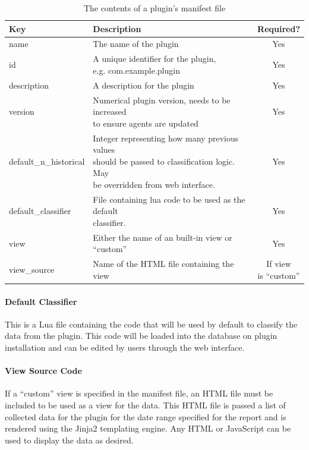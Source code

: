\documentclass[bsc,deptreport,twoside,parskip,singlespacing,notimes]{infthesis}
\begin{document}
\begin{table}[H]
	\centering
	\caption{The contents of a plugin's manifest file}
	\label{table-manifest-contents}
    \begin{tabular}{|l|l|c|}
    \hline
    \textbf{Key} & \textbf{Description} & \textbf{Required?} \\ \hline \hline
    name
    	& The name of the plugin
    	& Yes \\ \hline
    id
    	& \shortstack[l]{A unique identifier for the plugin,\\
    		e.g. com.example.plugin}
    	& Yes \\ \hline
    description
    	& A description for the plugin
    	& Yes \\ \hline
    version
    	& \shortstack[l]{Numerical plugin version, needs to be increased\\to ensure
    		agents are updated}
    	& Yes \\ \hline
    default\_n\_historical
    	& \shortstack[l]{Integer representing how many previous values \\
    		should be passed to classification logic. May\\be overridden from web interface.}
    	& Yes \\ \hline
    default\_classifier
    	& \shortstack[l]{File containing lua code to be used as the default\\
    		classifier.}
    	& Yes \\ \hline
    view
    	& Either the name of an built-in view or ``custom''
    	& Yes \\ \hline
    view\_source
    	& Name of the HTML file containing the view
    	& \shortstack[c]{If view\\is ``custom''} \\ \hline
    \end{tabular}
\end{table}

\paragraph*{Default Classifier}
	This is a Lua file containing the code that will be used by default to classify
	the data from the plugin.  This code will be loaded into the database on plugin
	installation and can be edited by users through the web interface.

\paragraph*{View Source Code}
	If a ``custom'' view is specified in the manifest file, an HTML file must be
	included to be used as a view for the data.  This HTML file is passed a list of
	collected data for the plugin for the date range specified for the report
	and is rendered using the Jinja2 templating engine.  Any HTML or JavaScript
	can be used to display the data as desired.
\end{document}

